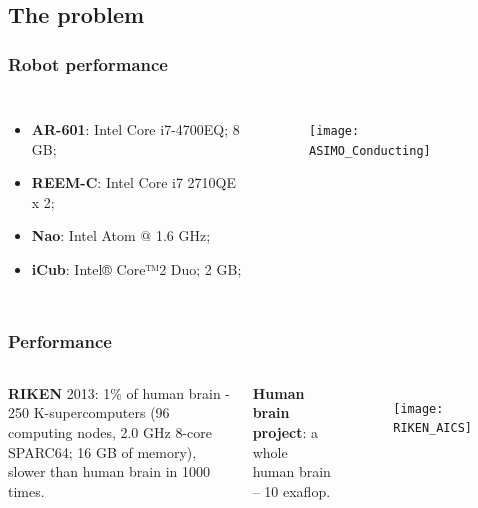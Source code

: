 \documentclass[12pt, aspectratio=169]{beamer}
\begin{document}
\subsection{The problem} %
\begin{frame}
\frametitle{Robot performance}
\begin{columns}[c] %

\begin{itemize}
\item \textbf{AR-601}: Intel Core i7-4700EQ; 8 GB;
\item \textbf{REEM-C}: Intel Core i7 2710QE x 2;
\item \textbf{Nao}: Intel Atom @ 1.6 GHz;
\item \textbf{iCub}: Intel® Core™2 Duo; 2 GB;
\end{itemize}


\begin{figure}
\texttt{[image: ASIMO\_Conducting]}
\end{figure}
\end{columns}
\end{frame}

\begin{frame}
\frametitle{Performance}
\begin{columns}[c] %

\textbf{RIKEN} 2013: 1\% of human brain - 250 K-supercomputers
(96 computing nodes, 2.0 GHz 8-core SPARC64; 16 GB of memory), slower than human brain in 1000 times. 

\textbf{Human brain project}: a whole human brain -- 10 exaflop.


\begin{figure}
\texttt{[image: RIKEN\_AICS]}
\end{figure}
\end{columns}
\end{frame}
\end{document}
